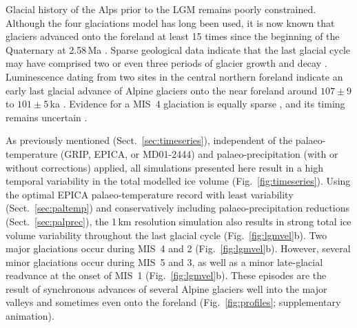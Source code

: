 \documentclass[tc, manuscript]{copernicus}
\begin{document}
    Glacial history of the Alps prior to the LGM remains poorly constrained.
    Although the four glaciations model \citep{Penck.Bruckner.1909} has long
    been used, it is now known that glaciers advanced onto the foreland at
    least 15 times since the beginning of the Quaternary at 2.58\,Ma
    \citep{Schluchter.1991, Preusser.etal.2011}. Sparse geological
    data indicate that the last glacial cycle may have comprised two or even
    three periods of glacier growth and decay \citep{Preusser.2004, Ivy-Ochs.etal.2008}.
    Luminescence dating from two sites in the central northern foreland
    indicate an early last glacial advance of Alpine glaciers onto the near
    foreland around $107\pm9$ to $101\pm5$\,ka \citep{Preusser.etal.2003,
    Preusser.Schluchter.2004}. Evidence for a MIS~4 glaciation is equally
    sparse \citep[Sect.~\ref{sec:footprints};][]{Keller.Krayss.2010,
    Barrett.etal.2017, Haldimann.etal.2017}, and its timing remains uncertain
    \citep[e.g.,][]{Link.Preusser.2006, Preusser.etal.2007}.

    As previously mentioned (Sect.~\ref{sec:timeseries}), independent of the
    palaeo-temperature (GRIP, EPICA, or MD01-2444) and palaeo-precipitation
    (with or without corrections) applied, all simulations presented here
    result in a high temporal variability in the total modelled ice volume
    (Fig.~\ref{fig:timeseries}). Using the optimal EPICA palaeo-temperature
    record with least variability (Sect.~\ref{sec:paltemp}) and conservatively
    including palaeo-precipitation reductions (Sect.~\ref{sec:palprec}), the
    1\,km resolution simulation also results in strong total ice volume
    variability throughout the last glacial cycle (Fig.~\ref{fig:lgmvel}b).
    Two major glaciations occur during MIS~4 and 2 (Fig.~\ref{fig:lgmvel}b).
    However, several minor glaciations occur during MIS~5 and 3, as well as a
    minor late-glacial readvance at the onset of MIS~1
    (Fig.~\ref{fig:lgmvel}b). These episodes are the result of synchronous
    advances of several Alpine glaciers well into the major valleys and sometimes
    even onto the foreland (Fig.~\ref{fig:profiles}; supplementary animation).
\end{document}
